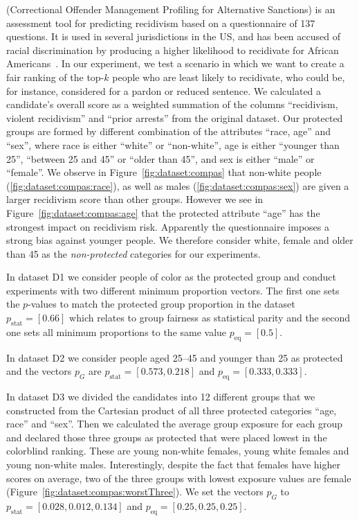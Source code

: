  (Correctional Offender Management Profiling for Alternative Sanctions) is an assessment tool for predicting recidivism based on a questionnaire of 137 questions. It is used in several jurisdictions in the US, and has been accused of racial discrimination by producing a higher likelihood to recidivate for African Americans~\cite{angwin_2016_machine}.
%
In our experiment, we test a scenario in which we want to create a fair ranking of the top-$k$ people who are least likely to recidivate, who could be, for instance, considered for a pardon or reduced sentence.
%
We calculated a candidate's overall score as a weighted summation of the columns ``recidivism, violent recidivism'' and ``prior arrests'' from the original dataset.
%
Our protected groups are formed by different combination of the attributes ``race, age'' and ``sex'', where race is either ``white'' or ``non-white'', age is either ``younger than 25'', ``between 25 and 45'' or ``older than 45'', and sex is either ``male'' or ``female''.
%
We observe in Figure~\ref{fig:dataset:compas} that non-white people (\ref{fig:dataset:compas:race}), as well as males (\ref{fig:dataset:compas:sex}) are given a larger recidivism score than other groups.
%
However we see in Figure~\ref{fig:dataset:compas:age} that the protected attribute ``age'' has the strongest impact on recidivism risk. 
%
Apparently the questionnaire imposes a strong bias against younger people.
%
We therefore consider white, female and older than 45 as the \emph{non-protected} categories for our experiments.

In dataset D1 we consider people of color as the protected group and conduct experiments with two different minimum proportion vectors.
%
The first one sets the $p$-values to match the protected group proportion in the dataset $p_{\text{stat}}=[0.66]$ which relates to group fairness as statistical parity and the second one sets all minimum proportions to the same value $p_{\text{eq}}=[0.5]$.

In dataset D2 we consider people aged 25--45 and younger than 25 as protected and the vectors $p_G$ are $p_{\text{stat}}=[0.573,0.218]$ and $p_{\text{eq}}=[0.333, 0.333]$. 

In dataset D3 we divided the candidates into 12 different groups that we constructed from the Cartesian product of all three protected categories ``age, race'' and ``sex''. 
%
Then we calculated the average group exposure for each group and declared those three groups as protected that were placed lowest in the colorblind ranking.
%
These are young non-white females, young white females and young non-white males.
%
Interestingly, despite the fact that females have higher scores on average, two of the three groups with lowest exposure values are female (Figure~\ref{fig:dataset:compas:worstThree}).
%
We set the vectors $p_G$ to $p_{\text{stat}}=[0.028,0.012,0.134]$ and $p_{\text{eq}}=[0.25,0.25,0.25]$. 

